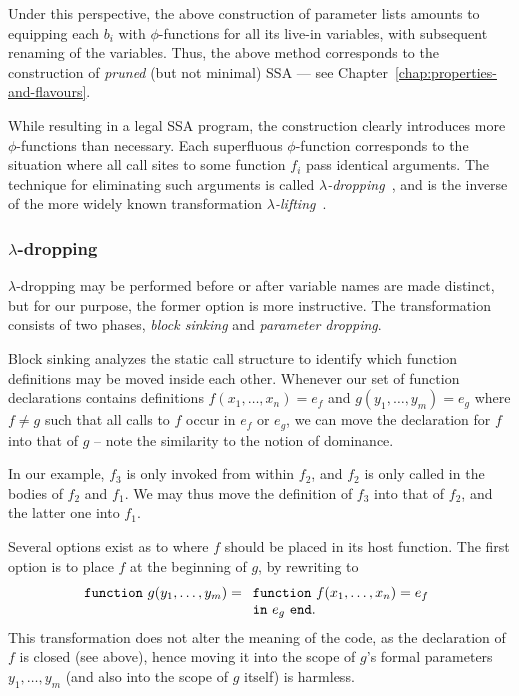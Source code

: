 Under this perspective, the above construction of parameter lists
amounts to equipping each $b_i$ with $\phi$-functions for all its
live-in variables, with subsequent renaming of the variables. Thus,
the above method corresponds to the construction of \emph{pruned} (but
not minimal) SSA --- see Chapter~\ref{chap:properties-and-flavours}.

While resulting in a legal SSA program, the construction clearly
introduces more $\phi$-functions than necessary. Each superfluous
$\phi$-function corresponds to the situation where all call sites to
some function $f_i$ pass identical arguments. The technique for
eliminating such arguments is called
\emph{$\lambda$-dropping}~\cite{DBLP:journals/tcs/DanvyS00}, and is
the inverse of the more widely known transformation
\emph{$\lambda$-lifting}~\cite{DBLP:conf/fpca/Johnsson85}. 

\subsubsection{$\lambda$-dropping}

$\lambda$-dropping may be performed before or after variable names are
made distinct, but for our purpose, the former option is more
instructive.  The transformation consists of two phases, \emph{block
sinking} and \emph{parameter dropping}.

Block sinking analyzes the static call structure to identify which
function definitions may be moved inside each other. Whenever our set
of function declarations contains definitions $f (x_1,\ldots,x_n) =
e_f$ and $ g (y_1,\ldots,y_m) = e_g$ where $f \neq g$ such that all
calls to $f$ occur in $e_f$ or $e_g$, we can move the declaration for
$f$ into that of $g$ -- note the similarity to the notion of
dominance.

In our example, $f_3$ is only invoked from
within $f_2$, and $f_2$ is only called in the bodies of $f_2$ and
$f_1$.  We may thus move the definition of $f_3$ into that of $f_2$,
and the latter one into $f_1$.

Several options exist as to where $f$ should be placed in its host
function. The first option is to place $f$ at the beginning of $g$,
by rewriting to 
$$\mathtt{function}\ g(y_1,\ldots,y_m) =
\begin{array}[t]{l} 
  \mathtt{function}\ f(x_1,\ldots,x_n) = e_f\\
  \mathtt{in}\ e_g\ \mathtt{end}.
\end{array}
$$ This transformation does not alter the meaning of the code, as the
declaration of $f$ is closed (see above), hence moving it into the
scope of $g$'s formal parameters $y_1,\ldots,y_m$ (and also into the
scope of $g$ itself) is harmless. 


